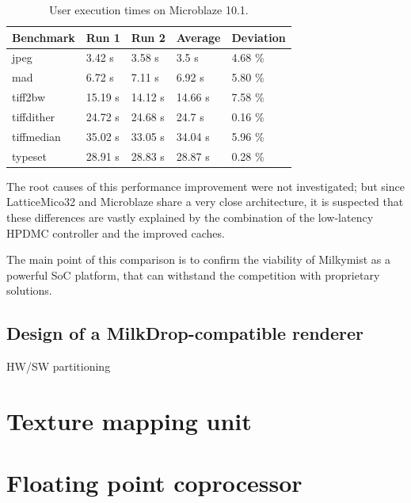 \documentclass[a4paper,11pt]{kthesis}
\begin{document}
\begin{table}
\centering
\begin{tabular}{|l|l|l|l|l|}
\hline
\textbf{Benchmark} & \textbf{Run 1} & \textbf{Run 2} & \textbf{Average} & \textbf{Deviation}  \\
\hline
jpeg & 3.42 s & 3.58 s & 3.5 s & 4.68 \% \\
\hline
mad & 6.72 s & 7.11 s & 6.92 s & 5.80 \% \\
\hline
tiff2bw & 15.19 s & 14.12 s & 14.66 s & 7.58 \% \\
\hline
tiffdither & 24.72 s & 24.68 s & 24.7 s & 0.16 \% \\
\hline
tiffmedian & 35.02 s & 33.05 s & 34.04 s & 5.96 \% \\
\hline
typeset & 28.91 s & 28.83 s & 28.87 s & 0.28 \% \\
\hline
\end{tabular}
\label{tab:microblazespeed}
\caption{User execution times on Microblaze 10.1.}
\end{table}

The root causes of this performance improvement were not investigated; but since LatticeMico32 and Microblaze share a very close architecture, it is suspected that these differences are vastly explained by the combination of the low-latency HPDMC controller and the improved caches.

The main point of this comparison is to confirm the viability of Milkymist as a powerful SoC platform, that can withstand the competition with proprietary solutions.

\section{Design of a MilkDrop-compatible renderer}
HW/SW partitioning

\chapter{Texture mapping unit}
\label{ch:tmu}

\chapter{Floating point coprocessor}

{}

\end{document}
